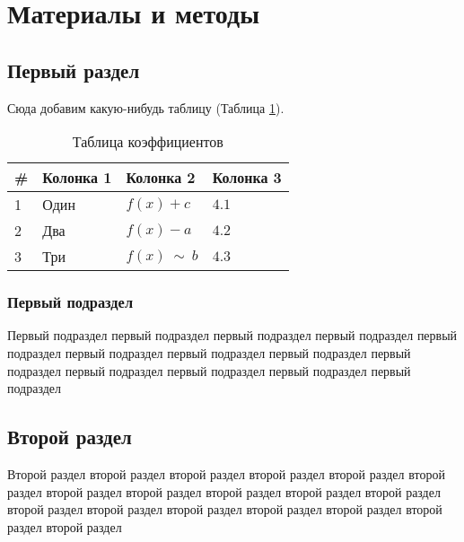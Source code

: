 \section{Материалы и методы}

\subsection{Первый раздел}
    Сюда добавим какую-нибудь таблицу (Таблица \ref{table:01-coeffs}). 
    
    \begin{table}[H]
        \caption{Таблица коэффициентов} \label{table:01-coeffs}
        \begin{tabular}{|p{0.6cm}|p{4.9cm}|p{4.5cm}|p{4cm}|}
        \hline \# & Колонка 1 & Колонка 2 & Колонка 3 \\
        \hline 1 & Один & $f(x) + c$ & $4.1 $ \\
        \hline 2 & Два & $f(x) - a$ & $4.2 $ \\
        \hline 3 & Три & $f(x) \ \sim \ b$ & $4.3$ \\
        \hline
        \end{tabular}
    \end{table}
    
    \subsubsection{Первый подраздел}
        Первый подраздел первый подраздел первый подраздел первый подраздел первый подраздел первый подраздел первый подраздел первый подраздел первый подраздел первый подраздел первый подраздел первый подраздел первый подраздел 

\subsection{Второй раздел}
    Второй раздел второй раздел второй раздел второй раздел второй раздел второй раздел второй раздел второй раздел второй раздел второй раздел второй раздел второй раздел второй раздел второй раздел второй раздел второй раздел второй раздел второй раздел 
    
        
\clearpage